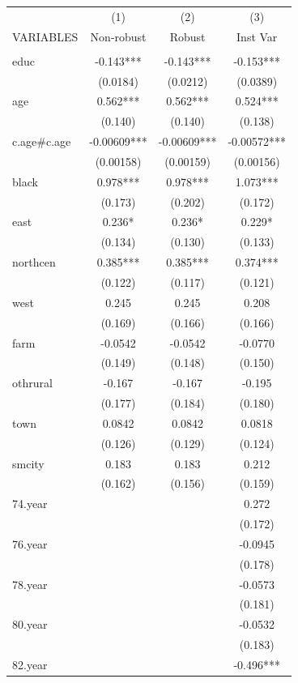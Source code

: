 \documentclass[]{article}
\begin{document}
\begin{table}
    \centering
\begin{tabular}{lccc} \hline
 & (1) & (2) & (3) \\
VARIABLES & Non-robust & Robust & Inst Var \\ \hline
 &  &  &  \\
educ & -0.143*** & -0.143*** & -0.153*** \\
 & (0.0184) & (0.0212) & (0.0389) \\
age & 0.562*** & 0.562*** & 0.524*** \\
 & (0.140) & (0.140) & (0.138) \\
c.age\#c.age & -0.00609*** & -0.00609*** & -0.00572*** \\
 & (0.00158) & (0.00159) & (0.00156) \\
black & 0.978*** & 0.978*** & 1.073*** \\
 & (0.173) & (0.202) & (0.172) \\
east & 0.236* & 0.236* & 0.229* \\
 & (0.134) & (0.130) & (0.133) \\
northcen & 0.385*** & 0.385*** & 0.374*** \\
 & (0.122) & (0.117) & (0.121) \\
west & 0.245 & 0.245 & 0.208 \\
 & (0.169) & (0.166) & (0.166) \\
farm & -0.0542 & -0.0542 & -0.0770 \\
 & (0.149) & (0.148) & (0.150) \\
othrural & -0.167 & -0.167 & -0.195 \\
 & (0.177) & (0.184) & (0.180) \\
town & 0.0842 & 0.0842 & 0.0818 \\
 & (0.126) & (0.129) & (0.124) \\
smcity & 0.183 & 0.183 & 0.212 \\
 & (0.162) & (0.156) & (0.159) \\
74.year &  &  & 0.272 \\
 &  &  & (0.172) \\
76.year &  &  & -0.0945 \\
 &  &  & (0.178) \\
78.year &  &  & -0.0573 \\
 &  &  & (0.181) \\
80.year &  &  & -0.0532 \\
 &  &  & (0.183) \\
82.year &  &  & -0.496*** \\

\end{tabular}
\end{table}
\end{document}
